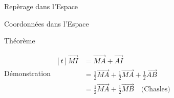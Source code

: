 \documentclass{cours}
\begin{document}
\begin{Gpartie}{Repèrage dans l'Espace}
\begin{Spartie}{Coordonnées dans l'Espace}
\begin{SSpartie}{Théorème}
                \begin{SSSpartie}{Démonstration} 
                    $\begin{aligned}[t]
                        \overrightarrow{MI}&=\overrightarrow{MA}+\overrightarrow{AI} \\
                        &=\tfrac{1}{2}\overrightarrow{MA}+\tfrac{1}{2}\overrightarrow{MA}+\tfrac{1}{2}\overrightarrow{AB} \\
                        &=\tfrac{1}{2}\overrightarrow{MA}+\tfrac{1}{2}\overrightarrow{MB}\quad\text{(Chasles)}
                    \end{aligned}$
                \end{SSSpartie}
            \end{SSpartie}
        \end{Spartie}
    \end{Gpartie}
\end{document}
